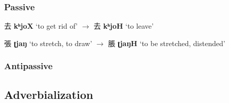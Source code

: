 \documentclass[oneside,a4paper,11pt]{article}
\newcommand{\ipa}[1]{\textbf{{\phon\mbox{#1}}}} %
\newcommand{\zh}[1]{{\cn #1}}
\newcommand{\zhc}[2]{\zh{#1} \ipa{#2}}
\begin{document}
\subsubsection{Passive}

\zhc{去}{kʰjoX}  `to get rid of' $\rightarrow$ \zhc{去}{kʰjoH}  `to leave'

\zhc{張}{ʈjaŋ}  `to stretch, to draw' $\rightarrow$ \zhc{脹}{ʈjaŋH}  `to be stretched, distended'
\subsubsection{Antipassive}

\subsection{Adverbialization}



\end{document}
